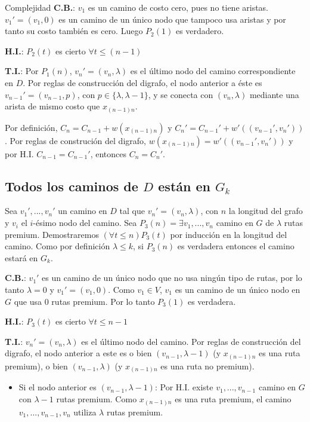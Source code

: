 \begin{subsection}{Complejidad}
\textbf{C.B.}: 
$v_1$ es un camino de costo cero, pues no tiene aristas. $v_1'=(v_1, 0)$ es un camino de un único nodo que tampoco usa aristas y por tanto su costo también es cero. Luego $P_2(1)$ es verdadero. 

\textbf{H.I.}: $P_2(t)$ es cierto $\forall t \leq (n-1)$

\textbf{T.I.}: 
Por $P_1(n)$, $v_n' = (v_n, \lambda)$ es el último nodo del camino correspondiente en $D$. Por reglas de construcción del digrafo, el nodo anterior a éste es $v_{n-1}' = (v_{n-1}, p)$, con $p \in \{ \lambda, \lambda - 1 \}$, y se conecta con $(v_n, \lambda)$ mediante una arista de mismo costo que $x_{(n-1)n}$.

Por definición, $C_n = C_{n-1} + w(x_{(n-1)n})$ y $C_n' = C_{n-1}' + w'((v_{n-1}', v_n'))$. Por reglas de construción del digrafo, $w(x_{(n-1)n}) = w'((v_{n-1}', v_n'))$ y por H.I. $C_{n-1} = C_{n-1}'$, entonces $C_n = C_n'$.


\subsection*{Todos los caminos de $D$ están en $G_k$}

Sea $v_1', ..., v_n'$ un camino en $D$ tal que $v_n' = (v_n, \lambda)$, con $n$ la longitud del grafo y $v_i$ el $i$-ésimo nodo del camino. Sea $P_3(n) = \exists v_1, ..., v_n$ camino en $G$ de $\lambda$ rutas premium. Demostraremos $(\forall t \leq n)P_3(t)$ por inducción en la longitud del camino.  Como por definición $\lambda \leq k$, si $P_3(n)$ es verdadera entonces el camino estará en $G_k$.

\textbf{C.B.}: $v_1'$ es un camino de un único nodo que no usa ningún tipo de rutas, por lo tanto $\lambda = 0$ y $v_1' = (v_1, 0)$. Como $v_1 \in V$, $v_1$ es un camino de un único nodo en $G$ que usa 0 rutas premium. Por lo tanto $P_3(1)$ es verdadera. 

\textbf{H.I.}: $P_3(t)$ es cierto $\forall t \leq n-1$

\textbf{T.I.}: $v_n' = (v_n, \lambda)$ es el último nodo del camino. Por reglas de construcción del digrafo, el nodo anterior a este es o bien $(v_{n-1}, \lambda - 1)$ (y $x_{(n-1)n}$ es una ruta premium), o bien $(v_{n-1}, \lambda)$ (y $x_{(n-1)n}$ es una ruta no premium).

\begin{itemize}

\item Si el nodo anterior es $(v_{n-1}, \lambda - 1)$: Por H.I. existe $v_1, ..., v_{n-1}$ camino en $G$ con $\lambda - 1$ rutas premium. Como $x_{(n-1)n}$ es una ruta premium, el camino $v_1, ..., v_{n-1}, v_n$ utiliza $\lambda$ rutas premium.


\end{itemize}
\end{subsection}
